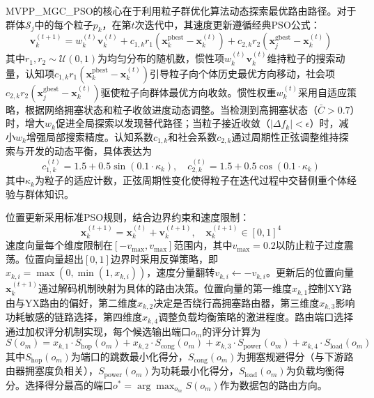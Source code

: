 \documentclass[11pt,a4paper]{article}
\begin{document}
MVPP\_MGC\_PSO的核心在于利用粒子群优化算法动态探索最优路由路径。对于群体$\mathcal{S}_j$中的每个粒子$p_k$，在第$t$次迭代中，其速度更新遵循经典PSO公式：
\begin{equation}
\mathbf{v}_k^{(t+1)} = w_k^{(t)} \mathbf{v}_k^{(t)} + c_{1,k} r_1 (\mathbf{x}_k^{\text{pbest}} - \mathbf{x}_k^{(t)}) + c_{2,k} r_2 (\mathbf{x}_j^{\text{gbest}} - \mathbf{x}_k^{(t)})
\end{equation}
其中$r_1, r_2 \sim \mathcal{U}(0, 1)$为均匀分布的随机数，惯性项$w_k^{(t)} \mathbf{v}_k^{(t)}$维持粒子的搜索动量，认知项$c_{1,k} r_1 (\mathbf{x}_k^{\text{pbest}} - \mathbf{x}_k^{(t)})$引导粒子向个体历史最优方向移动，社会项$c_{2,k} r_2 (\mathbf{x}_j^{\text{gbest}} - \mathbf{x}_k^{(t)})$驱使粒子向群体最优方向收敛。惯性权重$w_k^{(t)}$采用自适应策略，根据网络拥塞状态和粒子收敛进度动态调整。当检测到高拥塞状态（$\bar{C} > 0.7$）时，增大$w_k$促进全局探索以发现替代路径；当粒子接近收敛（$|\Delta f_k| < \epsilon$）时，减小$w_k$增强局部搜索精度。认知系数$c_{1,k}$和社会系数$c_{2,k}$通过周期性正弦调整维持探索与开发的动态平衡，具体表达为
\begin{equation}
c_{1,k}^{(t)} = 1.5 + 0.5 \sin(0.1 \cdot \kappa_k), \quad c_{2,k}^{(t)} = 1.5 + 0.5 \cos(0.1 \cdot \kappa_k)
\end{equation}
其中$\kappa_k$为粒子的适应计数，正弦周期性变化使得粒子在迭代过程中交替侧重个体经验与群体知识。

位置更新采用标准PSO规则，结合边界约束和速度限制：
\begin{equation}
\mathbf{x}_k^{(t+1)} = \mathbf{x}_k^{(t)} + \mathbf{v}_k^{(t+1)}, \quad \mathbf{x}_k^{(t+1)} \in [0, 1]^4
\end{equation}
速度向量每个维度限制在$[-v_{\max}, v_{\max}]$范围内，其中$v_{\max} = 0.2$以防止粒子过度震荡。位置向量超出$[0, 1]$边界时采用反弹策略，即$x_{k,i} = \max(0, \min(1, x_{k,i}))$，速度分量翻转$v_{k,i} \leftarrow -v_{k,i}$。更新后的位置向量$\mathbf{x}_k^{(t+1)}$通过解码机制映射为具体的路由决策。位置向量的第一维度$x_{k,1}$控制XY路由与YX路由的偏好，第二维度$x_{k,2}$决定是否绕行高拥塞路由器，第三维度$x_{k,3}$影响功耗敏感的链路选择，第四维度$x_{k,4}$调整负载均衡策略的激进程度。路由端口选择通过加权评分机制实现，每个候选输出端口$o_m$的评分计算为
\begin{equation}
S(o_m) = x_{k,1} \cdot S_{\text{hop}}(o_m) + x_{k,2} \cdot S_{\text{cong}}(o_m) + x_{k,3} \cdot S_{\text{power}}(o_m) + x_{k,4} \cdot S_{\text{load}}(o_m)
\end{equation}
其中$S_{\text{hop}}(o_m)$为端口的跳数最小化得分，$S_{\text{cong}}(o_m)$为拥塞规避得分（与下游路由器拥塞度负相关），$S_{\text{power}}(o_m)$为功耗最小化得分，$S_{\text{load}}(o_m)$为负载均衡得分。选择得分最高的端口$o^* = \arg\max_{o_m} S(o_m)$作为数据包的路由方向。
\end{document}

